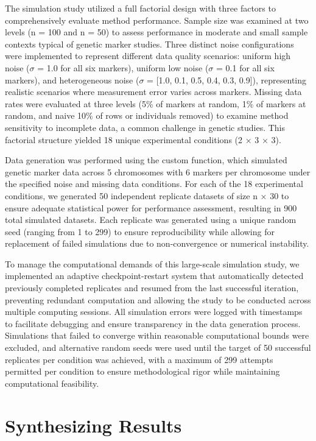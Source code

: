 \documentclass[
  12pt,
]{article}
\begin{document}
The simulation study utilized a full factorial design with three factors
to comprehensively evaluate method performance. Sample size was examined
at two levels (n = 100 and n = 50) to assess performance in moderate and
small sample contexts typical of genetic marker studies. Three distinct
noise configurations were implemented to represent different data
quality scenarios: uniform high noise (\(\sigma\) = 1.0 for all six markers),
uniform low noise (\(\sigma\) = 0.1 for all six markers), and heterogeneous noise
(\(\sigma\) = {[}1.0, 0.1, 0.5, 0.4, 0.3, 0.9{]}), representing realistic
scenarios where measurement error varies across markers. Missing data
rates were evaluated at three levels (5\% of markers at random, 1\% of markers at random, and
naive 10\% of rows or individuals removed) to examine method sensitivity to incomplete
data, a common challenge in genetic studies. This factorial structure
yielded 18 unique experimental conditions (2 × 3 × 3).

Data generation was performed using the custom function, which simulated
genetic marker data across 5 chromosomes with 6 markers per chromosome
under the specified noise and missing data conditions.
For each of the 18 experimental conditions, we generated 50 independent
replicate datasets of size n × 30 to ensure adequate statistical power
for performance assessment, resulting in 900 total simulated datasets.
Each replicate was generated using a unique random seed (ranging from 1
to 299) to ensure reproducibility while allowing for replacement of
failed simulations due to non-convergence or numerical instability. 

To manage the computational demands of this large-scale simulation
study, we implemented an adaptive checkpoint-restart system that
automatically detected previously completed replicates and resumed from
the last successful iteration, preventing redundant computation and
allowing the study to be conducted across multiple computing sessions.
All simulation errors were logged with timestamps to facilitate
debugging and ensure transparency in the data generation process.
Simulations that failed to converge within reasonable computational
bounds were excluded, and alternative random seeds were used until the
target of 50 successful replicates per condition was achieved, with a
maximum of 299 attempts permitted per condition to ensure methodological
rigor while maintaining computational feasibility.

\section{Synthesizing Results}
\end{document}
